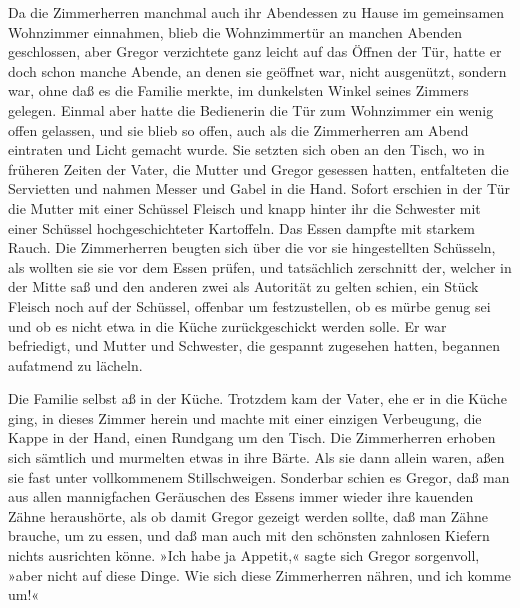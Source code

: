Da die Zimmerherren manchmal auch ihr Abendessen zu Hause im gemeinsamen
Wohnzimmer einnahmen, blieb die Wohnzimmertür an manchen Abenden
geschlossen, aber Gregor verzichtete ganz leicht auf das Öffnen der Tür,
hatte er doch schon manche Abende, an denen sie geöffnet war, nicht
ausgenützt, sondern war, ohne daß es die Familie merkte, im dunkelsten
Winkel seines Zimmers gelegen. Einmal aber hatte die Bedienerin die Tür
zum Wohnzimmer ein wenig offen gelassen, und sie blieb so offen, auch
als die Zimmerherren am Abend eintraten und Licht gemacht wurde. Sie
setzten sich oben an den Tisch, wo in früheren Zeiten der Vater, die
Mutter und Gregor gesessen hatten, entfalteten die Servietten und nahmen
Messer und Gabel in die Hand. Sofort erschien in der Tür die Mutter mit
einer Schüssel Fleisch und knapp hinter ihr die Schwester mit einer
Schüssel hochgeschichteter Kartoffeln. Das Essen dampfte mit starkem
Rauch. Die Zimmerherren beugten sich über die vor sie hingestellten
Schüsseln, als wollten sie sie vor dem Essen prüfen, und tatsächlich
zerschnitt der, welcher in der Mitte saß und den anderen zwei als
Autorität zu gelten schien, ein Stück Fleisch noch auf der Schüssel,
offenbar um festzustellen, ob es mürbe genug sei und ob es nicht etwa in
die Küche zurückgeschickt werden solle. Er war befriedigt, und Mutter
und Schwester, die gespannt zugesehen hatten, begannen aufatmend zu
lächeln.

Die Familie selbst aß in der Küche. Trotzdem kam der Vater, ehe er in
die Küche ging, in dieses Zimmer herein und machte mit einer einzigen
Verbeugung, die Kappe in der Hand, einen Rundgang um den Tisch. Die
Zimmerherren erhoben sich sämtlich und murmelten etwas in ihre Bärte.
Als sie dann allein waren, aßen sie fast unter vollkommenem
Stillschweigen. Sonderbar schien es Gregor, daß man aus allen
mannigfachen Geräuschen des Essens immer wieder ihre kauenden Zähne
heraushörte, als ob damit Gregor gezeigt werden sollte, daß man Zähne
brauche, um zu essen, und daß man auch mit den schönsten zahnlosen
Kiefern nichts ausrichten könne. »Ich habe ja Appetit,« sagte sich
Gregor sorgenvoll, »aber nicht auf diese Dinge. Wie sich diese
Zimmerherren nähren, und ich komme um!«

